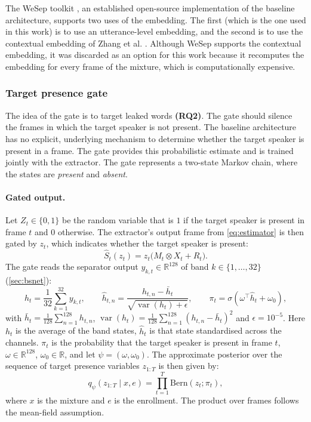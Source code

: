 The WeSep toolkit \cite{wang2024wesep}, an established open-source implementation of the baseline architecture, supports two uses of the embedding. The first (which is the one used in this work) is to use an utterance-level embedding, and the second is to use the contextual embedding of Zhang et al. \cite{zhang2025multi}. Although WeSep supports the contextual embedding, it was discarded as an option for this work because it recomputes the embedding for every frame of the mixture, which is computationally expensive. 

\subsubsection{Target presence gate}
\label{sec:present}
The idea of the gate is to target leaked words \textbf{(RQ2)}. The gate should silence the frames in which the target speaker is not present. The baseline architecture has no explicit, underlying mechanism to determine whether the target speaker is present in a frame. The gate provides this probabilistic estimate and is trained jointly with the extractor. The gate represents a two-state Markov chain, where the states are \emph{present} and \emph{absent}. 
\paragraph{Gated output.} Let $Z_t \in \{0, 1\}$ be the random variable that is $1$ if the target speaker is present in frame $t$ and $0$ otherwise. The extractor's output frame from \eqref{eq:estimator} is then gated by $z_t$, which indicates whether the target speaker is present:
   \begin{equation}
  \hat{S}_t(z_t) = z_t \big( M_t \otimes X_t + R_t \big).
  \label{eq:gated-output}
  \end{equation} 
The gate reads the separator output $y_{k,t} \in \mathbb{R}^{128}$ of band $k \in \{1, \dots, 32\}$  (\autoref{sec:bsnet}):
\begin{equation}
  h_t = \frac{1}{32}\sum_{k=1}^{32} y_{k,t}, \qquad
  \hat{h}_{t,n} = \frac{h_{t,n} - \bar{h}_t}{\sqrt{\operatorname{var}(h_t) + \epsilon}}, \qquad
  \pi_t = \sigma(\omega^\top \hat{h}_t + \omega_0),
\label{eq:gate-posterior}
\end{equation}
with $\bar{h}_t = \frac{1}{128}\sum_{n=1}^{128} h_{t,n}$, $\operatorname{var}(h_t) = \frac{1}{128}\sum_{n=1}^{128}(h_{t,n} - \bar{h}_t)^2$ and $\epsilon = 10^{-5}$. Here $h_t$ is the average of the band states, $\hat{h}_t$ is that state standardised across the channels. $\pi_t$ is the probability that the target speaker is present in frame $t$, $\omega \in \mathbb{R}^{128}$, $\omega_0 \in \mathbb{R}$, and let $\psi = (\omega, \omega_0)$. The approximate posterior over the sequence of target presence variables $z_{1:T}$ \cite{kingma2014autoencoding} is then given by:
\begin{equation}
  q_\psi(z_{1:T} \mid x, e) = \prod_{t=1}^{T}  \mathrm{Bern}(z_t; \pi_t),
  \label{eq:gate-posterior-sequence}
\end{equation}
where $x$ is the mixture and $e$ is the enrollment. The product over frames follows the mean-field assumption.
